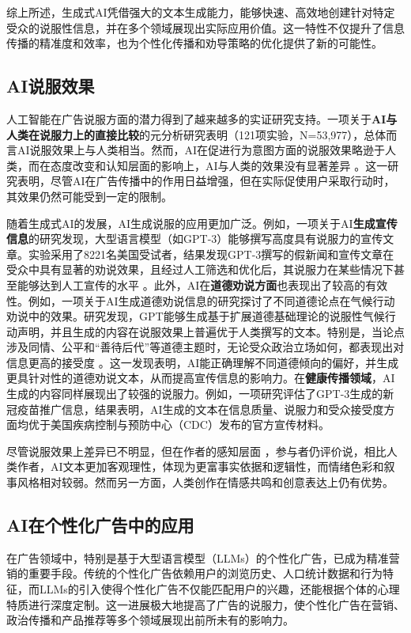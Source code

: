 综上所述，生成式AI凭借强大的文本生成能力，能够快速、高效地创建针对特定受众的说服性信息，并在多个领域展现出实际应用价值。这一特性不仅提升了信息传播的精准度和效率，也为个性化传播和劝导策略的优化提供了新的可能性。


\subsection{AI说服效果}
人工智能在广告说服方面的潜力得到了越来越多的实证研究支持。一项关于\textbf{AI与人类在说服力上的直接比较}的元分析研究表明（121项实验，N=53,977），总体而言AI说服效果上与人类相当。然而，AI在促进行为意图方面的说服效果略逊于人类，而在态度改变和认知层面的影响上，AI与人类的效果没有显著差异 \citep{huang2023artificial}。这一研究表明，尽管AI在广告传播中的作用日益增强，但在实际促使用户采取行动时，其效果仍然可能受到一定的限制。

随着生成式AI的发展，AI生成说服的应用更加广泛。例如，一项关于AI\textbf{生成宣传信息}的研究发现，大型语言模型（如GPT-3）能够撰写高度具有说服力的宣传文章。实验采用了8221名美国受试者，结果发现GPT-3撰写的假新闻和宣传文章在受众中具有显著的劝说效果，且经过人工筛选和优化后，其说服力在某些情况下甚至能够达到人工宣传的水平 \citep{goldstein2024persuasive}。此外，AI在\textbf{道德劝说方面}也表现出了较高的有效性。例如，一项关于AI生成道德劝说信息的研究探讨了不同道德论点在气候行动劝说中的效果。研究发现，GPT能够生成基于扩展道德基础理论的说服性气候行动声明，并且生成的内容在说服效果上普遍优于人类撰写的文本。特别是，当论点涉及同情、公平和“善待后代”等道德主题时，无论受众政治立场如何，都表现出对信息更高的接受度 \citep{nisbett2023convincing}。这一发现表明，AI能正确理解不同道德倾向的偏好，并生成更具针对性的道德劝说文本，从而提高宣传信息的影响力。在\textbf{健康传播领域}，AI生成的内容同样展现出了较强的说服力。例如，一项研究评估了GPT-3生成的新冠疫苗推广信息，结果表明，AI生成的文本在信息质量、说服力和受众接受度方面均优于美国疾病控制与预防中心（CDC）发布的官方宣传材料。

尽管说服效果上差异已不明显，但在作者的感知层面 \citep{nisbett2023convincing}，参与者仍评价说，相比人类作者，AI文本更加客观理性，体现为更富事实依据和逻辑性，而情绪色彩和叙事风格相对较弱。然而另一方面，人类创作在情感共鸣和创意表达上仍有优势。

\subsection{AI在个性化广告中的应用}

在广告领域中，特别是基于大型语言模型（LLMs）的个性化广告，已成为精准营销的重要手段。传统的个性化广告依赖用户的浏览历史、人口统计数据和行为特征，而LLMs的引入使得个性化广告不仅能匹配用户的兴趣，还能根据个体的心理特质进行深度定制。这一进展极大地提高了广告的说服力，使个性化广告在营销、政治传播和产品推荐等多个领域展现出前所未有的影响力。


